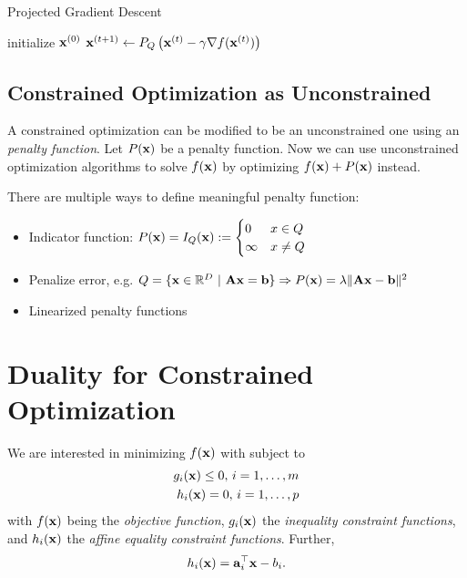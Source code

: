 \begin{algorithm}[H]
\caption{Projected Gradient Descent}
\begin{algorithmic}[1]
\State initialize \(\boldsymbol{\mathrm{x}}^{(0)}\)
	\State \(\boldsymbol{\mathrm{x}}^{(t+1)} \gets P_Q\left(\boldsymbol{\mathrm{x}}^{(t)} - \gamma \nabla f(\boldsymbol{\mathrm{x}}^{(t)})\right)\)
\EndFor
\EndProcedure
\end{algorithmic}
\end{algorithm}

\subsection{Constrained Optimization as Unconstrained}
A constrained optimization can be modified to be an unconstrained one using an \emph{penalty function}. Let \(P(\boldsymbol{\mathrm{x}})\) be a penalty function. Now we can use unconstrained optimization algorithms to solve \(f(\boldsymbol{\mathrm{x}})\) by optimizing \(f(\boldsymbol{\mathrm{x}}) + P(\boldsymbol{\mathrm{x}})\) instead.

There are multiple ways to define meaningful penalty function:
\begin{itemize}
\item Indicator function: \( P(\boldsymbol{\mathrm{x}}) = I_Q(\boldsymbol{\mathrm{x}}) := \begin{cases} 0 & x \in Q\\ \infty & x \neq Q \end{cases}\)
\item Penalize error, e.g. \(Q = \{\boldsymbol{\mathrm{x}} \in \mathbb{R}^D \ |\ \boldsymbol{\mathrm{Ax}} = \boldsymbol{\mathrm{b}}\} \Rightarrow P(\boldsymbol{\mathrm{x}}) = \lambda \|\boldsymbol{\mathrm{Ax}} - \boldsymbol{\mathrm{b}}\|^2\)
\item Linearized penalty functions
\end{itemize}

\section{Duality for Constrained Optimization}
We are interested in minimizing \(f(\boldsymbol{\mathrm{x}})\) with subject to
\begin{align*}
g_i(\boldsymbol{\mathrm{x}}) \leq 0,\, i = 1, \ldots, m\\
h_i(\boldsymbol{\mathrm{x}}) = 0,\, i = 1, \ldots, p
\end{align*}
with \(f(\boldsymbol{\mathrm{x}})\) being the \emph{objective function}, \(g_i(\boldsymbol{\mathrm{x}})\) the \emph{inequality constraint functions}, and \(h_i(\boldsymbol{\mathrm{x}})\) the \emph{affine equality constraint functions}. Further, \[h_i(\boldsymbol{\mathrm{x}}) = \boldsymbol{\mathrm{a}}_i^\top \boldsymbol{\mathrm{x}} - b_i.\]

